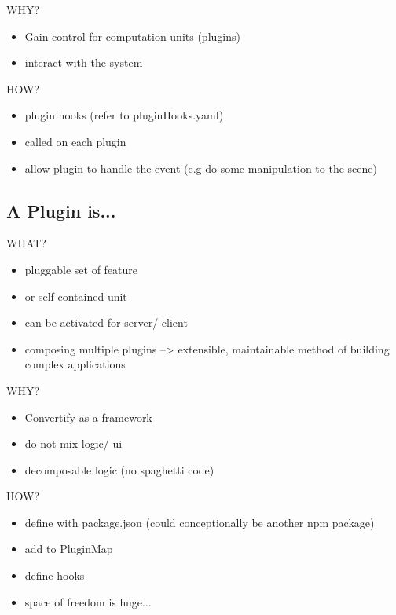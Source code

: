 \documentclass[../ClassicThesis.tex]{subfiles}
\begin{document}
WHY?

\begin{itemize}
\item Gain control for computation units (plugins)
\item interact with the system
\end{itemize}

HOW?

\begin{itemize}
\item plugin hooks (refer to pluginHooks.yaml)
\item called on each plugin
\item allow plugin to handle the event (e.g do some manipulation to the scene)
\end{itemize}

\subsection{A Plugin is...}

WHAT?

\begin{itemize}
\item pluggable set of feature
\item or self-contained unit
\item can be activated for server/ client
\item composing multiple plugins --> extensible, maintainable method of building
  complex applications
\end{itemize}

WHY?

\begin{itemize}
\item Convertify as a framework
\item do not mix logic/ ui
\item decomposable logic (no spaghetti code)
\end{itemize}

HOW?

\begin{itemize}
\item define with package.json (could conceptionally be another npm package)
\item add to PluginMap
\item define hooks
\item space of freedom is huge...
\end{itemize}

\end{document}
